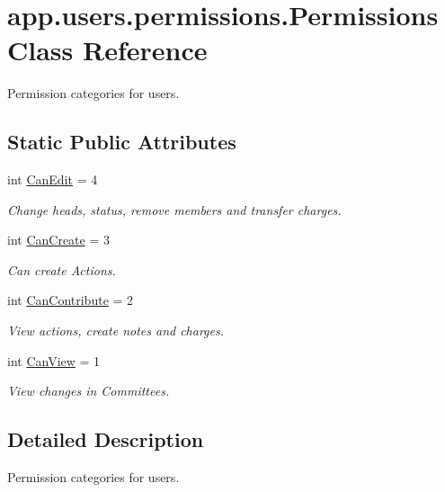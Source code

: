 \hypertarget{classapp_1_1users_1_1permissions_1_1_permissions}{}\section{app.\+users.\+permissions.\+Permissions Class Reference}
\label{classapp_1_1users_1_1permissions_1_1_permissions}


Permission categories for users.  


\subsection*{Static Public Attributes}
\begin{DoxyCompactItemize}
\item 
int \mbox{\hyperlink{classapp_1_1users_1_1permissions_1_1_permissions_a91cbb1b3d525ea47ffe4b5b12bfe979e}{Can\+Edit}} = 4
\begin{DoxyCompactList}\small\item\em Change heads, status, remove members and transfer charges. \end{DoxyCompactList}\item 
int \mbox{\hyperlink{classapp_1_1users_1_1permissions_1_1_permissions_aabbe27ce336c3209218a350fd4a46425}{Can\+Create}} = 3
\begin{DoxyCompactList}\small\item\em Can create Actions. \end{DoxyCompactList}\item 
int \mbox{\hyperlink{classapp_1_1users_1_1permissions_1_1_permissions_a473f3e4b52e00caaac924ebe2967f398}{Can\+Contribute}} = 2
\begin{DoxyCompactList}\small\item\em View actions, create notes and charges. \end{DoxyCompactList}\item 
int \mbox{\hyperlink{classapp_1_1users_1_1permissions_1_1_permissions_af5c7edc65060e65ac211996e10c5809a}{Can\+View}} = 1
\begin{DoxyCompactList}\small\item\em View changes in Committees. \end{DoxyCompactList}\end{DoxyCompactItemize}


\subsection{Detailed Description}
Permission categories for users. 

